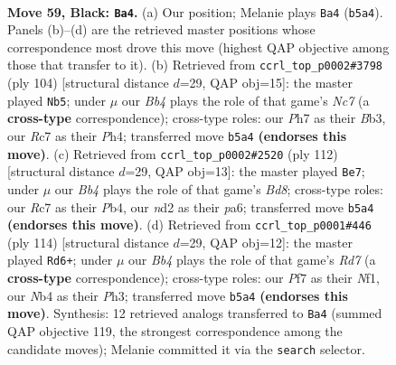 \documentclass[11pt]{article}
\begin{document}
\clearpage

\begin{figure}[p]\centering
\begin{subfigure}{0.46\textwidth}\centering
\resizebox{\linewidth}{!}{%
\newchessgame
\chessboard[
  setfen={5k2/2r2p1p/6p1/1b2P3/1n3Pp1/8/3N1K1P/1B6 b - - 9 59},
  showmover=false,
  pgfstyle=straightmove, color=movearrow, markmove={b5-a4}
]}
\caption{}
\end{subfigure}\hfill
\begin{subfigure}{0.46\textwidth}\centering
\resizebox{\linewidth}{!}{%
\newchessgame
\chessboard[
  setfen={8/2Nn1k2/3p3p/2bP4/5P1P/1B3K2/5P2/8 w - - 5 53},
  showmover=false,
  pgfstyle=straightmove, color=movearrow, markmove={c7-b5}
]}
\caption{}
\end{subfigure}
\\[4pt]
\begin{subfigure}{0.46\textwidth}\centering
\resizebox{\linewidth}{!}{%
\newchessgame
\chessboard[
  setfen={3B4/8/p7/3p1kp1/1P1P3p/P4P2/5KP1/3b4 w - - 12 57},
  showmover=false,
  pgfstyle=straightmove, color=movearrow, markmove={d8-e7}
]}
\caption{}
\end{subfigure}\hfill
\begin{subfigure}{0.46\textwidth}\centering
\resizebox{\linewidth}{!}{%
\newchessgame
\chessboard[
  setfen={8/3R4/6k1/2pPp3/2r1Pp1b/5P1P/8/5NK1 w - - 2 58},
  showmover=false,
  pgfstyle=straightmove, color=movearrow, markmove={d7-d6}
]}
\caption{}
\end{subfigure}
\caption{\textbf{Move 59, Black: \texttt{Ba4}.} (a) Our position; Melanie plays \texttt{Ba4} (\texttt{b5a4}). Panels (b)--(d) are the retrieved master positions whose correspondence most drove this move (highest QAP objective among those that transfer to it). (b) Retrieved from \texttt{ccrl\_top\_p0002\#3798} (ply 104) [structural distance $d$=29, QAP obj=15]: the master played \texttt{Nb5}; under $\mu$ our \emph{Bb4} plays the role of that game's \emph{Nc7} (a \textbf{cross-type} correspondence); cross-type roles: our \emph{P}h7 as their \emph{B}b3, our \emph{R}c7 as their \emph{P}h4; transferred move \texttt{b5a4} \textbf{(endorses this move)}. (c) Retrieved from \texttt{ccrl\_top\_p0002\#2520} (ply 112) [structural distance $d$=29, QAP obj=13]: the master played \texttt{Be7}; under $\mu$ our \emph{Bb4} plays the role of that game's \emph{Bd8}; cross-type roles: our \emph{R}c7 as their \emph{P}b4, our \emph{n}d2 as their \emph{p}a6; transferred move \texttt{b5a4} \textbf{(endorses this move)}. (d) Retrieved from \texttt{ccrl\_top\_p0001\#446} (ply 114) [structural distance $d$=29, QAP obj=12]: the master played \texttt{Rd6+}; under $\mu$ our \emph{Bb4} plays the role of that game's \emph{Rd7} (a \textbf{cross-type} correspondence); cross-type roles: our \emph{P}f7 as their \emph{N}f1, our \emph{N}b4 as their \emph{P}h3; transferred move \texttt{b5a4} \textbf{(endorses this move)}. Synthesis: 12 retrieved analogs transferred to \texttt{Ba4} (summed QAP objective 119, the strongest correspondence among the candidate moves); Melanie committed it via the \texttt{search} selector.}
\label{fig:thought-m117}
\end{figure}
\end{document}
